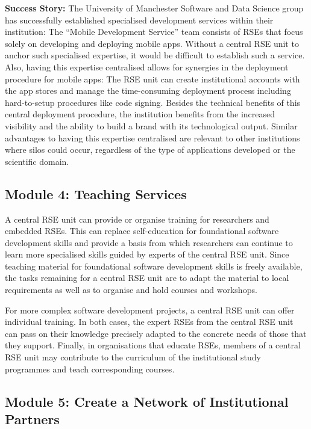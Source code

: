 \documentclass[a4paper]{article}
\begin{document}
\begin{mdframed}
\textbf{Success Story:} The University of Manchester Software and Data Science group has successfully established specialised development services within their institution:
The “Mobile Development Service” \autocite{manchester_mobile} team consists of RSEs that focus solely on developing and deploying mobile apps.
Without a central RSE unit to anchor such specialised expertise, it would be difficult to establish such a service.
Also, having this expertise centralised allows for synergies in the deployment procedure for mobile apps:
The RSE unit can create institutional accounts with the app stores and manage the time-consuming deployment process including hard-to-setup procedures like code signing.
Besides the technical benefits of this central deployment procedure, the institution benefits from the increased visibility and the ability to build a brand with its technological output.
Similar advantages to having this expertise centralised are relevant to other institutions where silos could occur, regardless of the type of applications developed or the scientific domain.
\end{mdframed}

\subsection{Module 4: Teaching Services}%
\label{sec:teaching}

A central RSE unit can provide or organise training for researchers and embedded RSEs.
This can replace self-education for foundational software development skills and provide a basis from which researchers can continue to learn more specialised skills guided by experts of the central RSE unit.
Since teaching material for foundational software development skills is freely available,
  the tasks remaining for a central RSE unit are to adapt the material to local requirements as well as to organise and hold courses and workshops.

For more complex software development projects, a central RSE unit can offer individual training.
In both cases, the expert RSEs from the central RSE unit can pass on their knowledge precisely adapted to the concrete needs of those that they support.
Finally, in organisations that educate RSEs, members of a central RSE unit may contribute to the curriculum of the institutional study programmes and teach corresponding courses.

\subsection{Module 5: Create a Network of Institutional Partners}%
\label{sec:partners}
\end{document}
